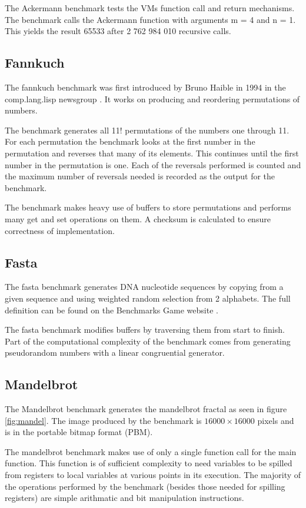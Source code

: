 \documentclass[english,a4paper,12pt]{report}
\begin{document}
The Ackermann benchmark tests the VMs function call and return
mechanisms. The benchmark calls the Ackermann function with arguments
m = 4 and n = 1. This yields the result 65533 after 2 762 984 010
recursive calls.

\subsection{Fannkuch}

The fannkuch benchmark was first introduced by Bruno Haible in 1994 in
the comp.lang.lisp newsgroup \cite{fannkuch}. It works on producing
and reordering permutations of numbers.

The benchmark generates all 11! permutations of the numbers one
through 11. For each permutation the benchmark looks at the first
number in the permutation and reverses that many of its elements. This
continues until the first number in the permutation is one. Each of
the reversals performed is counted and the maximum number of reversals
needed is recorded as the output for the benchmark.

The benchmark makes heavy use of buffers to store permutations and
performs many get and set operations on them. A checksum is calculated
to ensure correctness of implementation.

\subsection{Fasta}
The fasta benchmark generates DNA nucleotide sequences by copying from
a given sequence and using weighted random selection from 2
alphabets. The full definition can be found on the Benchmarks Game
website \cite{fasta}.

The fasta benchmark modifies buffers by traversing them from start to
finish. Part of the computational complexity of the benchmark comes
from generating pseudorandom numbers with a linear congruential
generator.

\subsection{Mandelbrot}

The Mandelbrot benchmark generates the mandelbrot fractal as seen in
figure \ref{fig:mandel}. The image produced by the benchmark is
$16 000\times16 000$ pixels and is in the portable bitmap format (PBM).

The mandelbrot benchmark makes use of only a single function call for
the main function. This function is of sufficient complexity to need
variables to be spilled from registers to local variables at various
points in its execution. The majority of the operations performed by
the benchmark (besides those needed for spilling registers) are simple
arithmatic and bit manipulation instructions.
\end{document}
